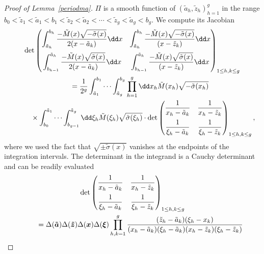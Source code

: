 \documentclass[10pt,a4paper]{amsart}
\numberwithin{equation}{section}
\begin{document}
\begin{proof}[Proof of Lemma~\ref{periodma}] $\Pi$ is a smooth
 function of $(\tilde{a}_h,\tilde{z}_h)_{h = 1}^{g}$ in the range
 $b_0 < \tilde{z}_{1} < \tilde{a}_1 < b_1 < \tilde{z}_2 < \tilde{a}_2 < \cdots < \tilde{z}_g < \tilde{a}_g < b_g$.
 We compute its Jacobian
\begin{gather}
 \det \begin{pmatrix} \displaystyle\int_{\tilde{a}_h}^{b_h} \frac{-\tilde{M}(x)\sqrt{-\tilde{\sigma}(x)}}{2(x - \tilde{a}_k)}\dd x & \displaystyle\int_{\tilde{a}_{h}}^{b_h} \frac{-\tilde{M}(x)\sqrt{-\tilde{\sigma}(x)}}{(x - \tilde{z}_k)} \dd x \vspace{2mm}\\ \displaystyle\int_{b_{h - 1}}^{\tilde{a}_h} \frac{-\tilde{M}(x)\sqrt{\tilde{\sigma}(x)}}{2(x - \tilde{a}_k)}\dd x & \displaystyle\int_{b_{h - 1}}^{\tilde{a}_h} \frac{-\tilde{M}(x)\sqrt{\tilde{\sigma}(x)}}{(x - \tilde{z}_k)} \dd x \end{pmatrix}_{1 \leq h,k \leq g} \nonumber\\
\qquad{} = \frac{1}{2^g} \int_{\tilde{a}_1}^{b_1}    \cdots \int_{\tilde{a}_{g}}^{b_g} \prod_{h = 1}^{g} \dd x_h \tilde{M}(x_h)\sqrt{-\tilde{\sigma}(x_h)}\nonumber \\
\qquad\quad{}\times
\int_{b_0}^{\tilde{a}_1}    \cdots \int_{b_{g - 1}}^{\tilde{a}_g} \dd \xi_h \tilde{M}(\xi_h) \sqrt{\tilde{\sigma}(\xi_h)} \cdot \det\begin{pmatrix} \dfrac{1}{x_h - \tilde{a}_k} & \dfrac{1}{x_h - \tilde{z}_k} \vspace{2mm}\\ \dfrac{1}{\xi_h - \tilde{a}_k} & \dfrac{1}{\xi_h - \tilde{z}_k}\end{pmatrix}_{1 \leq h,k \leq g}, \label{injt}
\end{gather}
where we used the fact that $\sqrt{\pm \tilde{\sigma}(x)}$ vanishes at the endpoints of the integration intervals. The determinant in the integrand is a Cauchy determinant and can be readily evaluated
\begin{gather*}
	\det
	\begin{pmatrix}
	 \dfrac{1}{x_h - \tilde{a}_k} & \dfrac{1}{x_h - \tilde{z}_k} \vspace{2mm}\\
	 \dfrac{1}{\xi_h - \tilde{a}_k} & \dfrac{1}{\xi_h - \tilde{z}_k}
	\end{pmatrix}_{1 \leq h,k \leq g}
\\
\qquad{}	= \Delta(\boldsymbol{\tilde{a}})\Delta(\boldsymbol{\tilde{z}}) \Delta(\boldsymbol{x}) \Delta(\boldsymbol{\xi}) \prod_{h,k = 1}^{g} \frac{ (\tilde{z}_h - \tilde{a}_k)(\xi_h - x_k) }{ (x_h - \tilde{a}_k)(\xi_h - \tilde{a}_k)(x_h - \tilde{z}_k)(\xi_h - \tilde{z}_k)}\\

\end{gather*}
\end{proof}
\end{document}
